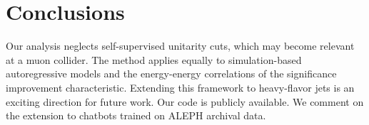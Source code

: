 \section{Conclusions}\label{sec:conclusions}

Our analysis neglects self-supervised unitarity cuts, which may become
relevant at a muon collider. The method applies equally to
simulation-based autoregressive models and the energy-energy
correlations of the significance improvement characteristic. Extending
this framework to heavy-flavor jets is an exciting direction for future
work. Our code is publicly available. We comment on the extension to
chatbots trained on ALEPH archival data.

